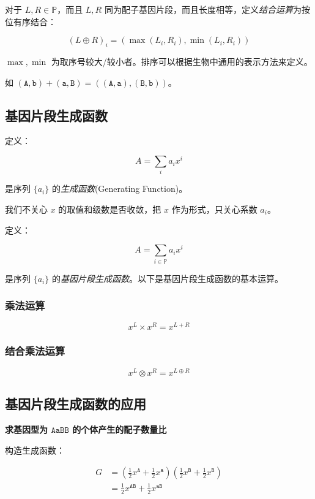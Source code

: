 \documentclass[12pt]{article} %
\begin{document}
对于 $L,R \in \mathbb{P}$，而且 $L,R$ 同为配子基因片段，而且长度相等，定义\textsl{结合运算}为按位有序结合：

$$(L \oplus R)_i=(\max(L_i,R_i),\min(L_i,R_i))$$

$\max,\min$ 为取序号较大/较小者。排序可以根据生物中通用的表示方法来定义。

如 $(\texttt{A},\texttt{b}) + (\texttt{a},\texttt{B})=((\texttt{A},\texttt{a}),(\texttt{B},\texttt{b}))$。

\subsection{基因片段生成函数} 

定义：

$$A=\sum_{i} a_i x^{i}$$

是序列 $\{a_i\}$ 的\textsl{生成函数}(Generating Function)。

我们不关心 $x$ 的取值和级数是否收敛，把 $x$ 作为形式，只关心系数 $a_i$。

定义：

$$A=\sum_{i \in \mathbb{P}} a_i x^{i}$$

是序列 $\{a_i\}$ 的\textsl{基因片段生成函数}。以下是基因片段生成函数的基本运算。


\subsubsection*{乘法运算}

$$x^L \times x^R=x^{L+R}$$

\subsubsection*{结合乘法运算}

$$x^L \otimes x^R=x^{L \oplus R}$$

\subsection{基因片段生成函数的应用}

\textbf{求基因型为 $\texttt{AaBB}$ 的个体产生的配子数量比}

构造生成函数：

$$\begin{aligned}
    G &= (\frac{1}{2} x^{\texttt{A}}+ \frac{1}{2}x^{\texttt{a}})(\frac{1}{2} x^{\texttt{B}}+ \frac{1}{2}x^{\texttt{B}}) \\
                &= \frac{1}{2} x^{\texttt{AB}} + \frac{1}{2} x^{\texttt{aB}}
\end{aligned}$$
\end{document}
